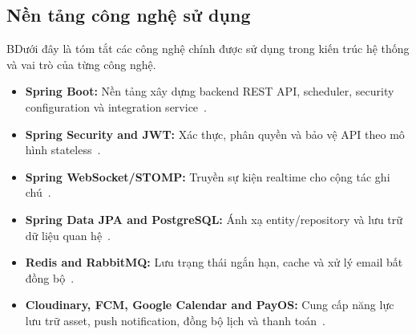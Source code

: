 \subsection{Nền tảng công nghệ sử dụng}
\label{subsec:platform-technologies}

BDưới đây là tóm tắt các công nghệ chính được sử dụng trong kiến trúc hệ thống và vai trò của từng công nghệ.

\begin{itemize}
    \item \textbf{Spring Boot:} Nền tảng xây dựng backend REST API, scheduler, security configuration và integration service~\cite{springbootdocs}.
    \item \textbf{Spring Security and JWT:} Xác thực, phân quyền và bảo vệ API theo mô hình stateless~\cite{springsecurityjwt}.
    \item \textbf{Spring WebSocket/STOMP:} Truyền sự kiện realtime cho cộng tác ghi chú~\cite{springwebsocketstomp}.
    \item \textbf{Spring Data JPA and PostgreSQL:} Ánh xạ entity/repository và lưu trữ dữ liệu quan hệ~\cite{springdatajpa,postgresqlabout}.
    \item \textbf{Redis and RabbitMQ:} Lưu trạng thái ngắn hạn, cache và xử lý email bất đồng bộ~\cite{redisoverview,rabbitmqtutorials}.
    \item \textbf{Cloudinary, FCM, Google Calendar and PayOS:} Cung cấp năng lực lưu trữ asset, push notification, đồng bộ lịch và thanh toán~\cite{cloudinaryjava,firebasefcm,googlecalendarjava,payoswebhook}.
\end{itemize}